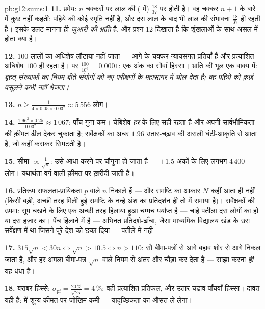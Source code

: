 \begin{solution}{pb:g12:sums:1}
\textbf{11.} प्रमेय: $n$ चक्करों पर लाल की \emph{}
( में) $\frac{18}{37}$ पर  होती है। वह चक्कर $n + 1$ के बारे में कुछ नहीं
कहती: पहिये की कोई स्मृति नहीं है, और दस लाल के बाद भी लाल की संभावना $\frac{18}{37}$
ही रहती है। इसके उलट मानना ही \emph{जुआरी की भ्रांति} है, और प्रश्न 12 दिखाता
है कि शृंखलाओं के साथ असल में होता क्या है।

\textbf{12.} $100$ लालों का अधिशेष लौटाया नहीं जाता --- आगे के चक्कर
न्यायसंगत प्रतियाँ हैं और प्रत्याशित अधिशेष $100$ ही रहता है। पर $\frac{100}{10^6} = 0.0001$: एक
अंक का सौवाँ हिस्सा। भ्रांति की भूल एक वाक्य में: \emph{बृहत् संख्याओं का
नियम बीते संयोगों को नए परीक्षणों के महासागर में घोल देता है; वह पहिये को
क़र्ज़ वसूलने कभी नहीं भेजता।}

\textbf{13.} $n \geq \frac{1}{4 \times 0.05 \times 0.03^2}
\approx 5\,556$ लोग।

\textbf{14.} $\frac{1.96^2 \times 0.25}{0.03^2} \approx
1\,067$: पाँच गुना कम। चेबिशेव \emph{हर}  के लिए सही रहता है
और अपनी सार्वभौमिकता की क़ीमत ढील देकर चुकाता है; सर्वेक्षकों का अचर $1.96$
उतार-चढ़ाव की असली घंटी-आकृति से आता है, जो कहीं कसकर सिमटती है।

\textbf{15.} सीमा $\propto \frac{1}{\sqrt n}$: उसे आधा करने पर  चौगुना हो जाता है ---
$\pm 1.5$ अंकों के लिए लगभग $4\,400$ लोग। यथार्थता वर्ग वाली क़ीमत पर ख़रीदी जाती
है।

\textbf{16.} प्रतिरूप सफलता-प्रायिकता $p$ वाले $n$  निकाले हैं ---
और समष्टि का आकार $N$ कहीं आता ही नहीं (किसी बड़ी, अच्छी तरह मिली हुई
समष्टि के नन्हे अंश का प्रतिदर्शन ही तो  में समाया है)। सर्वेक्षकों
की उपमा: सूप चखने के लिए एक अच्छी तरह हिलाया हुआ चम्मच पर्याप्त है --- चाहे
पतीला दस लोगों का हो या दस हज़ार का। पेंच हिलाने में है --- अभिनत प्रतिदर्श-ढाँचा,
जैसा माध्यमिक विद्यालय खंड के उस सर्वेक्षण में था जिसने पूरे देश को छका दिया
--- पतीले में नहीं।

\textbf{17.} $315\sqrt n < 30n \iff \sqrt n > 10.5 \iff
n > 110$: सौ बीमा-पत्रों से आगे बहाव शोर से आगे निकल जाता है, और हर
अगला बीमा-पत्र $\sqrt n$ वाले नियम से अंतर और चौड़ा कर देता है --- साझा करना
\emph{ही} यह धंधा है।

\textbf{18.}  बराबर हिस्से: $\sigma_{\text{pf}} =
\frac{20\,\%}{\sqrt{25}} = 4\,\%$: वही प्रत्याशित प्रतिफल, और
उतार-चढ़ाव पाँचवाँ हिस्सा। दावत यही है:  में शून्य क़ीमत पर
जोखिम-कमी ---  यादृच्छिकता का औसत ले लेना।


\end{solution}
